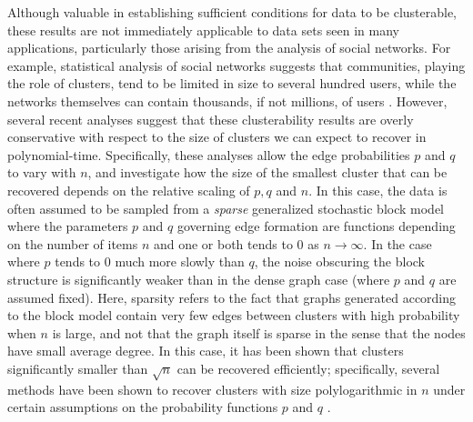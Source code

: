 \documentclass[twoside,11pt]{article}
\newcommand{\0}{\bs{0}}
\newcommand{\ra}{\rightarrow}
\begin{document}
Although valuable in establishing sufficient conditions for data to be clusterable, these results are not immediately
applicable to data sets seen in many applications, particularly those arising from the analysis of social networks.
For example, statistical analysis of social networks suggests that communities, playing the role of clusters,
tend to be limited in size to several hundred users, while the networks themselves can contain thousands, if not millions,
of users \citep{leskovec2008statistical, leskovec2009community}.
However, several recent analyses \citep{chen2014clustering,chen2014statistical, guedon2015community,jalali2015relative, rohe2012highest} suggest that these clusterability results are overly 
conservative with respect to the size of clusters we can expect to recover in polynomial-time. 
Specifically, these analyses allow the edge probabilities $p$ and
$q$ to vary with $n$, and investigate how the size of the smallest cluster
that can be recovered depends on the relative scaling of $p,q$ and $n$.
In this case, the data is often assumed to be sampled from a \emph{sparse} generalized stochastic block model where the parameters
\(p\) and \(q\) governing edge formation are functions depending on the number of items \(n\) and one
or both tends to \(0\) as \(n \ra \infty\). In the case where \(p \) tends to \(0\) much more slowly than \(q\), the noise
obscuring the block structure is significantly weaker than in the dense graph case (where \(p\) and \(q\) are assumed fixed).
Here, sparsity refers to the fact that graphs
generated according to the block model contain very few edges 
between
clusters with high probability when $n$ is large,
and not that the graph itself is sparse in the sense that the nodes
have small average degree.
In this %
case, it has been shown that clusters significantly smaller than 
\(\sqrt{n}\) can be recovered efficiently;
specifically, several methods have been shown to recover clusters with size polylogarithmic in \(n\) 
under certain assumptions on the probability functions \(p\) and \(q\)  \citep[see][]{chen2014clustering,chen2014statistical, guedon2015community,rohe2012highest}. 
\end{document}

